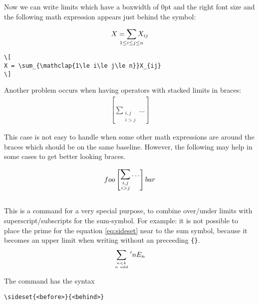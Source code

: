 \begin{table}[htb]
Now we can write limits which have a boxwidth of 0pt and the right font
size and the following math expression appears just behind the symbol:

\[
X = \sum_{\mathclap{1\le i\le j\le n}}X_{ij}
\]
\begin{lstlisting}
\[
X = \sum_{\mathclap{1\le i\le j\le n}}X_{ij}
\]
\end{lstlisting}

Another problem occurs when having operators with stacked limits in braces:
\begin{align}
\left[\sum_{\substack{i,j\\i>j}} \dots \right]
\end{align}

This case is not easy to handle when some other math expressions are around the braces
which should be on the same baseline. However, the following may help in some cases
to get better looking braces.

\begin{LTXexample}[width=0.45\linewidth,wide]
\begin{align}
foo \left[\begin{array}{@{}c@{}}
    \displaystyle\sum_{\substack{i,j\\i>j}} \dots
  \end{array}\right] bar
\end{align}
\end{LTXexample}


\subsection{}

This is a command for a very special purpose, to combine over/under
limits with superscript/subscripts for the
sum-symbol. For example: it is not possible to place the prime
for the equation \ref{eq:sideset} near to the sum symbol,
because it becomes an upper limit when writing without an preceeding \verb|{}|.
\begin{equation}
\sum_{n<k\atop n\ \textrm{odd}}{}'nE_{n}\label{eq:sideset}
\end{equation}

The command 
has the syntax

\begin{lstlisting}
\sideset{<before>}{<behind>}
\end{lstlisting}


\end{table}

